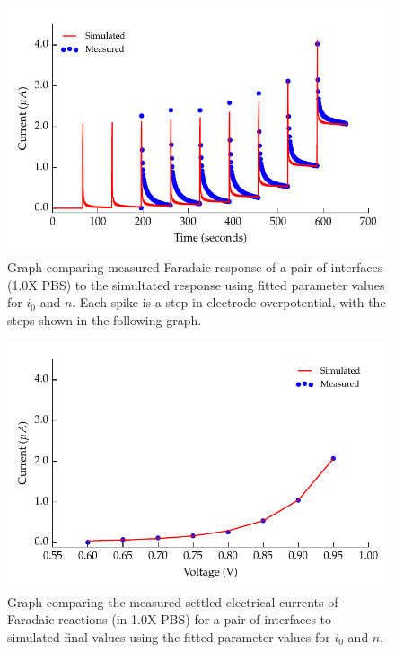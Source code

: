         \begin{figure}
          \centering
          \includegraphics{content/pt2/08-InterfaceParameters/graphics/graph_faradaic_currentVsTimeThesis}
          \caption{\label{fig:graph_faradaic_currentVsTimeThesis} Graph comparing measured Faradaic response of a pair of interfaces (1.0X PBS) to the simultated response using fitted parameter values for $i_0$ and $n$. Each spike is a step in electrode overpotential, with the steps shown in the following graph.} 
        \end{figure}
        \begin{figure}
          \centering
          \includegraphics{content/pt2/08-InterfaceParameters/graphics/graph_faradaic_currentVsVoltageThesis}
          \caption{\label{fig:graph_faradaic_currentVsVoltageThesis} Graph comparing the measured settled electrical currents of Faradaic reactions (in 1.0X PBS) for a pair of interfaces to simulated final values using the fitted parameter values for $i_0$ and $n$.}
        \end{figure}
